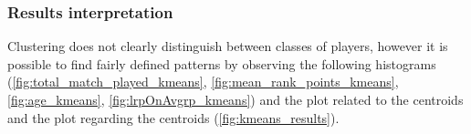 \subsubsection{Results interpretation}
Clustering does not clearly distinguish between classes of players, however it is possible to find fairly defined patterns by observing the following histograms (\ref{fig:total_match_played_kmeans}, \ref{fig:mean_rank_points_kmeans}, \ref{fig:age_kmeans}, \ref{fig:lrpOnAvgrp_kmeans}) and the plot related to the centroids  and the plot regarding the centroids (\ref{fig:kmeans_results}).



